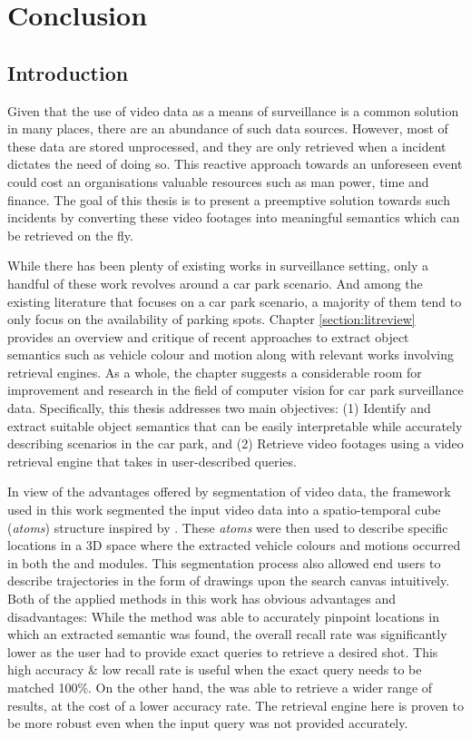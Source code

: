 
\chapter{Conclusion}
\label{section:conclusion}
\section*{Introduction}

Given that the use of video data as a means of surveillance is a common solution in many places, there are an abundance of such data sources. However, most of these data are stored unprocessed, and they are only retrieved when a incident dictates the need of doing so. 
This reactive approach towards an unforeseen event could cost an organisations valuable resources such as man power, time and finance. 
The goal of this thesis is to present a preemptive solution towards such incidents by converting these video footages into meaningful semantics which can be retrieved on the fly. 

While there has been plenty of existing works in surveillance setting, only a handful of these work revolves around a car park scenario. 
And among the existing literature that focuses on a car park scenario, a majority of them tend to only focus on the availability of parking spots. 
Chapter \ref{section:litreview} provides an overview and critique of recent approaches to extract object semantics such as vehicle colour and motion along with relevant works involving retrieval engines. As a whole, the chapter suggests a considerable room for improvement and research in the field of computer vision for car park surveillance data.
Specifically, this thesis addresses two main objectives: (1) Identify and extract suitable object semantics that can be easily interpretable while accurately describing scenarios in the car park, and (2) Retrieve video footages using a video retrieval engine that takes in user-described queries. 

In view of the advantages offered by segmentation of video data, the framework used in this work segmented the input video data into a spatio-temporal cube (\textit{atoms}) structure inspired by \cite{castanon2016retrieval}. These \textit{atoms} were then used to describe specific locations in a 3D space where the extracted vehicle colours and motions occurred in both the \versionOneExt and \versionTwoExt modules. This segmentation process also allowed end users to describe trajectories in the form of drawings upon the search canvas intuitively. Both of the applied methods in this work has obvious advantages and disadvantages: While the \versionOneRet method was able to accurately pinpoint locations in which an extracted semantic was found, the overall recall rate was significantly lower as the user had to provide exact queries to retrieve a desired shot. This high accuracy \& low recall rate is useful when the exact query needs to be matched 100\%. On the other hand, the \versionTwoRet was able to retrieve a wider range of results, at the cost of a lower accuracy rate. The retrieval engine here is proven to be more robust even when the input query was not provided accurately. 

